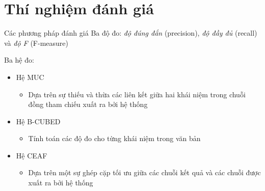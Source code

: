 \section{Thí nghiệm đánh giá}
\begin{frame}{Các phương pháp đánh giá}
\putlogo
Ba độ đo: \emph{độ đúng đắn} (precision), \emph{độ đầy đủ} (recall) và \emph{độ F} (F-measure)

Ba hệ đo:
\begin{itemize}
	\item Hệ MUC
	\begin{itemize}
		\item Dựa trên sự thiếu và thừa các liên kết giữa hai khái niệm trong chuỗi đồng tham chiếu xuất ra bởi hệ thống
	\end{itemize}
	\item Hệ B-CUBED
	\begin{itemize}
		\item Tính toán các độ đo cho từng khái niệm trong văn bản
	\end{itemize}
	\item Hệ CEAF
	\begin{itemize}
		\item Dựa trên một sự ghép cặp tối ưu giữa các chuỗi kết quả và các chuỗi được xuất ra bởi hệ thống
	\end{itemize}
\end{itemize}
\end{frame}

